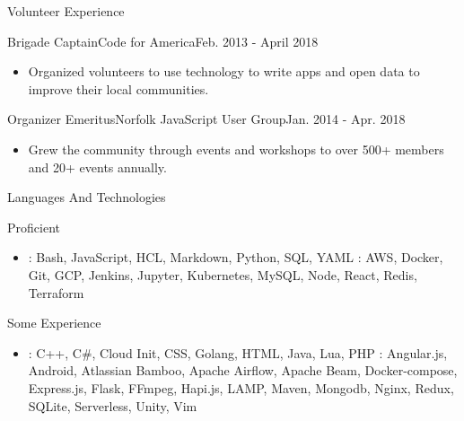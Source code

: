 \documentclass[]{mcdowellcv}
\begin{document}
    \begin{cvsection}{Volunteer Experience}
        \begin{cvsubsection}{Brigade Captain}{Code for America}{Feb. 2013 - April 2018}
            \begin{itemize}
                \item Organized volunteers to use technology to write apps and open data to improve their local communities.
            \end{itemize}

        \end{cvsubsection}

        \begin{cvsubsection}{Organizer Emeritus}{Norfolk JavaScript User Group}{Jan. 2014 - Apr. 2018}
            \begin{itemize}
                \item Grew the community through events and workshops to over 500+ members and 20+ events annually.
            \end{itemize}
        \end{cvsubsection}
    \end{cvsection}

    \begin{cvsection}{Languages And Technologies}
        \begin{cvsubsection}{Proficient}{}{}
            \begin{itemize}
                    \item {}: Bash, JavaScript, HCL, Markdown, Python, SQL, YAML \newline
                    : AWS, Docker, Git, GCP, Jenkins, Jupyter, Kubernetes, MySQL, Node, React, Redis, Terraform
            \end{itemize}
        \end{cvsubsection}
        \begin{cvsubsection}{Some Experience}{}{}
            \begin{itemize}
                    \item {}: C++, C\#, Cloud Init, CSS, Golang, HTML, Java, Lua, PHP  \newline
                    : Angular.js, Android, Atlassian Bamboo, Apache Airflow, Apache Beam,  Docker-compose, \newline Express.js, Flask, FFmpeg, Hapi.js, LAMP, Maven, Mongodb, Nginx, Redux, SQLite, Serverless, Unity, Vim
            \end{itemize}
        \end{cvsubsection}
    \end{cvsection}
\end{document}
